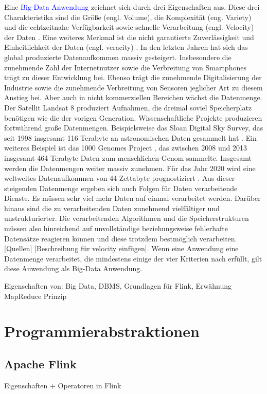 Eine \textcolor{blue}{Big-Data Anwendung} zeichnet sich durch drei Eigenschaften aus. Diese drei Charakteristika sind die Größe (engl. Volume), die Komplexität (eng. Variety) und die echtzeitnahe Verfügbarkeit sowie schnelle Verarbeitung (engl. Velocity) der Daten \cite{Laney2001}. Eine weiteres Merkmal ist die nicht garantierte Zuverlässigkeit und Einheitlichkeit der Daten (engl. veracity) \cite{Zikopoulos2012}. 
In den letzten Jahren hat sich das global produzierte Datenaufkommen massiv gesteigert. Insbesondere die zunehmende Zahl der Internetnutzer sowie die Verbreitung von Smartphones trägt zu dieser Entwicklung bei. Ebenso trägt die zunehmende Digitalisierung der Industrie sowie die zunehmende Verbreitung von Sensoren jeglicher Art zu diesem Anstieg bei. Aber auch in nicht kommerziellen Bereichen wächst die Datenmenge. Der Satellit Landsat 8 produziert Aufnahmen, die dreimal soviel Speicherplatz benötigen wie die der vorigen Generation. Wissenschaftliche Projekte produzieren fortwährend große Datenmengen. Beispielsweise das Sloan Digital Sky Survey, das seit 1998 insgesamt 116 Terabyte an astronomischen Daten gesammelt hat \cite{York2000, Alam2015}. Ein weiteres Beispiel ist das 1000 Genomes Project \cite{Baker2010}, das zwischen 2008 und 2013 insgesamt 464 Terabyte Daten zum menschlichen Genom sammelte. Insgesamt werden die Datenmengen weiter massiv zunehmen. Für das Jahr 2020 wird eine weltweites Datenaufkommen von 44 Zettabyte prognostiziert \cite{EMC2014}. Aus dieser steigenden Datenmenge ergeben sich auch Folgen für Daten verarbeitende Dienste. Es müssen sehr viel mehr Daten auf einmal verarbeitet werden. Darüber hinaus sind die zu verarbeitenden Daten zunehmend vielfältiger und unstrukturierter. Die verarbeitenden Algorithmen und die Speicherstrukturen müssen also hinreichend auf unvollständige beziehungsweise fehlerhafte Datensätze reagieren können und diese trotzdem bestmöglich verarbeiten. [Quellen] [Beschreibung für velocity einfügen].
Wenn eine Anwendung eine Datenmenge verarbeitet, die mindestens einige der vier Kriterien nach \cite{Laney2001} erfüllt, gilt diese Anwendung als Big-Data Anwendung. 


Eigenschaften von: Big Data, DBMS, Grundlagen für Flink, Erwähnung MapReduce Prinzip

\section{Programmierabstraktionen}
\subsection{Apache Flink}
Eigenschaften + Operatoren in Flink

